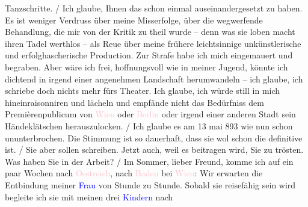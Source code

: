 {{{                        Tanzschritte.{ / }Ich glaube, Ihnen das schon einmal
                        auseinandergesetzt zu
                        haben. Es ist weniger Verdruss über meine Misserfolge, über die wegwerfende
                        Behandlung, die mir von der Kritik zu theil wurde – denn was sie loben macht
                        ihren Tadel werthlos – als Reue über meine frühere leichtsinnige
                        unkünstlerische und erfolghascherische Production. Zur Strafe habe ich mich
                        eingemauert und begraben. Aber wäre ich frei, hoffnungsvoll wie in meiner
                        Jugend, könnte ich dichtend in irgend einer angenehmen Landschaft
                        herumwandeln – ich glaube, ich schriebe doch nichts mehr fürs Theater. Ich
                        glaube, ich würde still in mich hineinraisonniren und lächeln und empfände
                        nicht das Bedürfniss dem Premièrenpublicum von \textcolor{pink}{Wien} oder \textcolor{pink}{Berlin} oder irgend
                        einer anderen Stadt sein Händeklätschen herauszulocken.{ / }Ich glaube es am 13 mai 893 wie nun schon
                        ununterbrochen. Die
                        Stimmung ist so dauerhaft, dass sie wol schon die definitive ist.{ / }Sie aber sollen schreiben. Jetzt auch, weil es beitragen wird, Sie zu
                        trösten. Was haben Sie in der Arbeit?{ / }Im Sommer, lieber Freund, komme ich auf ein paar Wochen nach \textcolor{pink}{Oestreich}, nach \textcolor{pink}{Baden} bei \textcolor{pink}{Wien}: Wir
                        erwarten die Entbindung meiner \textcolor{blue}{Frau} von Stunde zu Stunde. Sobald sie reisefähig
                        sein wird begleite ich sie mit meinen drei \textcolor{blue}{Kindern} nach
}}}
